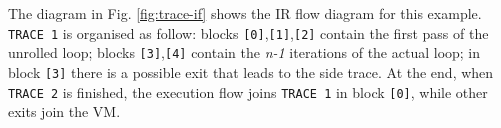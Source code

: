 \noindent
The diagram in Fig. \ref{fig:trace-if} shows the IR flow diagram for this example. \texttt{TRACE 1} is organised as follow: blocks \texttt{[0]},\texttt{[1]},\texttt{[2]} contain the first pass of the unrolled loop; blocks \texttt{[3]},\texttt{[4]} contain the \textit{n-1} iterations of the actual loop; in block \texttt{[3]} there is a possible exit that leads to the side trace. At the end, when \texttt{TRACE 2} is finished, the execution flow joins \texttt{TRACE 1} in block \texttt{[0]}, while other exits join the VM.

\begin{comment}
Possible side exits are indicated by the symbol $>$ in the IR dump. The number of the exit is related with the order in which it appears in the IR (e.g. the first $>$ symbol at line 0002 refers to the exit 1).
\end{comment}

